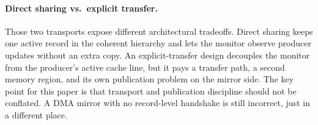\paragraph{Direct sharing vs.\ explicit transfer.}
Those two transports expose different architectural tradeoffs. Direct
sharing keeps one active record in the coherent hierarchy and lets the
monitor observe producer updates without an extra copy. An
explicit-transfer design decouples the monitor from the producer's
active cache line, but it pays a transfer path, a second memory region,
and its own publication problem on the mirror side. The key point for
this paper is that transport and publication discipline should not be
conflated. A DMA mirror with no record-level handshake is still
incorrect, just in a different place.
